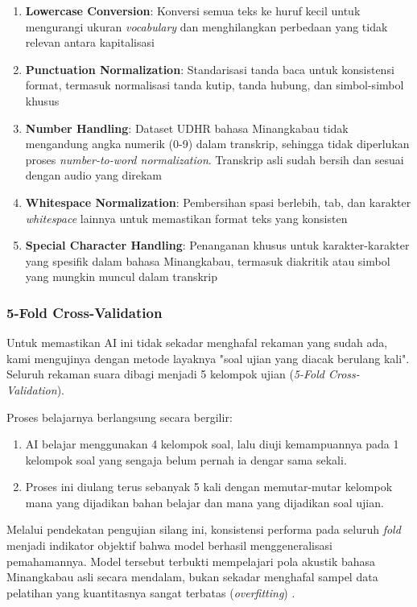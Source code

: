 \begin{enumerate}[noitemsep]
    \item \textbf{Lowercase Conversion}: Konversi semua teks ke huruf kecil untuk mengurangi ukuran \textit{vocabulary} dan menghilangkan perbedaan yang tidak relevan antara kapitalisasi \cite{radford2023whisper}
    \item \textbf{Punctuation Normalization}: Standarisasi tanda baca untuk konsistensi format, termasuk normalisasi tanda kutip, tanda hubung, dan simbol-simbol khusus \cite{radford2023whisper}
    \item \textbf{Number Handling}: Dataset UDHR bahasa Minangkabau tidak mengandung angka numerik (0-9) dalam transkrip, sehingga tidak diperlukan proses \textit{number-to-word normalization}. Transkrip asli sudah bersih dan sesuai dengan audio yang direkam
    \item \textbf{Whitespace Normalization}: Pembersihan spasi berlebih, tab, dan karakter \textit{whitespace} lainnya untuk memastikan format teks yang konsisten
    \item \textbf{Special Character Handling}: Penanganan khusus untuk karakter-karakter yang spesifik dalam bahasa Minangkabau, termasuk diakritik atau simbol yang mungkin muncul dalam transkrip \cite{koto2020minangkabau,sovia2022minangkabau}
\end{enumerate}

\subsubsection{5-Fold Cross-Validation}

Untuk memastikan AI ini tidak sekadar menghafal rekaman yang sudah ada, kami mengujinya dengan metode layaknya "soal ujian yang diacak berulang kali". Seluruh rekaman suara dibagi menjadi 5 kelompok ujian (\textit{5-Fold Cross-Validation}). 

Proses belajarnya berlangsung secara bergilir:
\begin{enumerate}
    \item AI belajar menggunakan 4 kelompok soal, lalu diuji kemampuannya pada 1 kelompok soal yang sengaja belum pernah ia dengar sama sekali.
    \item Proses ini diulang terus sebanyak 5 kali dengan memutar-mutar kelompok mana yang dijadikan bahan belajar dan mana yang dijadikan soal ujian.
\end{enumerate}

Melalui pendekatan pengujian silang ini, konsistensi performa pada seluruh \textit{fold} menjadi indikator objektif bahwa model berhasil menggeneralisasi pemahamannya. Model tersebut terbukti mempelajari pola akustik bahasa Minangkabau asli secara mendalam, bukan sekadar menghafal sampel data pelatihan yang kuantitasnya sangat terbatas (\textit{overfitting}) \cite{kohavi1995crossvalidation}.

